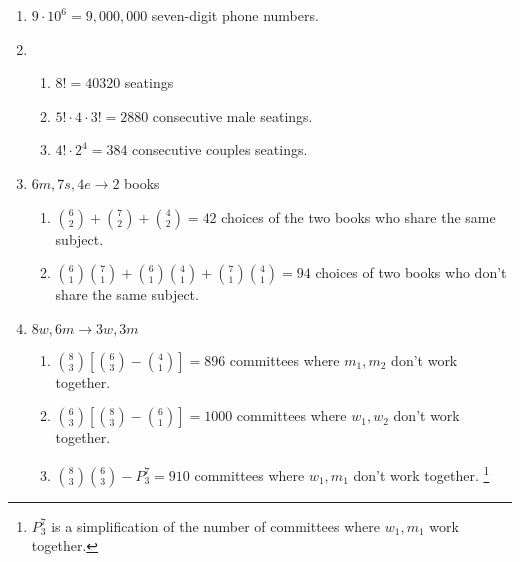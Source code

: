 \documentclass{article}
\title{\MakeUppercase{\jobname}}
\author{Justin Nguyen}
\date{\today}
\begin{document}
\maketitle

\begin{enumerate}
  \item $9\cdot 10^6 = 9,000,000$ seven-digit phone numbers. %
  
  \item \begin{enumerate}
    \item $8! = 40320$ seatings %
    \item $5!\cdot 4 \cdot 3! = 2880$ consecutive male seatings. %
    \item $4!\cdot 2^4 = 384$ consecutive couples seatings. %
  \end{enumerate}
  
  \item $6m, 7s, 4e \to 2$ books
  \begin{enumerate}
    \item $\binom{6}{2} + \binom{7}{2} + \binom{4}{2} = 42$ choices of the two books who share the same subject. %
    \item $\binom{6}{1}\binom{7}{1} + \binom{6}{1}\binom{4}{1} + \binom{7}{1}\binom{4}{1} = 94$ choices of two books who don't share the same subject. %
  \end{enumerate}
  
  \item $8w, 6m \to 3w, 3m$
  \begin{enumerate}
    \item $\binom{8}{3}[\binom{6}{3} - \binom{4}{1}] = 896$ committees where $m_1, m_2$ don't work together.
    \item $\binom{6}{3}[\binom{8}{3} - \binom{6}{1}] = 1000$ committees where $w_1, w_2$ don't work together.
    \item $\binom{8}{3}\binom{6}{3} - P^7_3 = 910$ committees where $w_1, m_1$ don't work together.%
    \footnote{$P^7_3$ is a simplification of the number of committees where $w_1, m_1$ work together.}
  \end{enumerate}
  

\end{enumerate}
\end{document}
